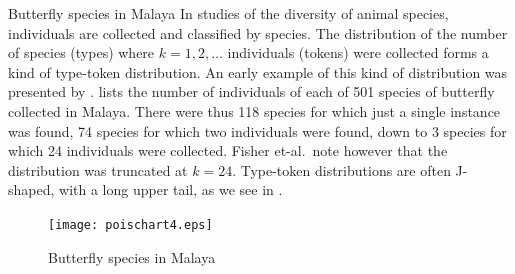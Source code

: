 \begin{Example}[butterfly]{Butterfly species in Malaya}
In studies of the diversity of animal species, individuals are
collected and classified by species.
The distribution of the number of species (types) where $k = 1, 2, \dots$
individuals (tokens) were collected forms a kind of type-token distribution.
An early example of this kind of distribution was presented by
\citet{Fisher-etal:43}.
 lists the number of individuals of each of
501 species of butterfly collected in Malaya.
There were thus 118 species for which just a single instance was found,
74 species for which two individuals were found,
down to 3 species for which 24 individuals were collected.
Fisher et-al.\  note however that the distribution was truncated
at $k = 24$.
Type-token distributions are often J-shaped, with a long upper tail,
as we see in .


\begin{figure}[htb]
  \centering
  \texttt{[image: poischart4.eps]}
  \caption{Butterfly species in Malaya}%
  \label{fig:poischart4}
\end{figure}
\end{Example}







